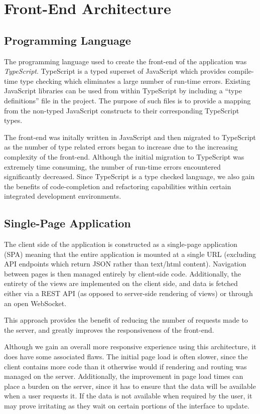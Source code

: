 \documentclass{l4proj}
\begin{document}
    \section{Front-End Architecture}
    
        \subsection{Programming Language}
        The programming language used to create the front-end of the application was \textit{TypeScript}. TypeScript is a typed superset of JavaScript which provides compile-time type checking which eliminates a large number of run-time errors. Existing JavaScript libraries can be used from within TypeScript by including a ``type definitions'' file in the project. The purpose of such files is to provide a mapping from the non-typed JavaScript constructs to their corresponding TypeScript types.
        
        The front-end was initally written in JavaScript and then migrated to TypeScript as the number of type related errors began to increase due to the increasing complexity of the front-end. Although the initial migration to TypeScript was extremely time consuming, the number of run-time errors encountered significantly decreased. Since TypeScript is a type checked language, we also gain the benefits of code-completion and refactoring capabilities within certain integrated development environments.
    
        \subsection{Single-Page Application}
    The client side of the application is constructed as a single-page application (SPA) meaning that the entire application is mounted at a single URL (excluding API endpoints which return JSON rather than text/html content). Navigation between pages is then managed entirely by client-side code. Additionally, the entirety of the views are implemented on the client side, and data is fetched either via a REST API (as opposed to server-side rendering of views) or through an open WebSocket. 

This approach provides the benefit of reducing the number of requests made to the server, and greatly improves the responsiveness of the front-end. 

Although we gain an overall more responsive experience using this architecture, it does have some associated flaws. The initial page load is often slower, since the client contains more code than it otherwise would if rendering and routing was managed on the server. Additionally, the improvement in page load times can place a burden on the server, since it has to ensure that the data will be available when a user requests it. If the data is not available when required by the user, it may prove irritating as they wait on certain portions of the interface to update.
\end{document}

